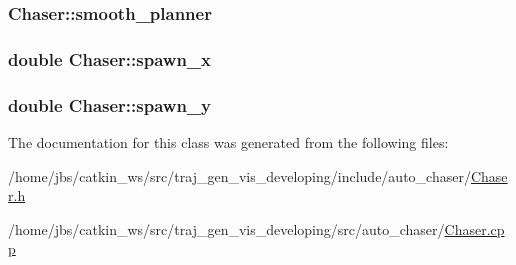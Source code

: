 \subsubsection[{\texorpdfstring{smooth\+\_\+planner}{smooth_planner}}]{ Chaser\+::smooth\+\_\+planner\hspace{0.3cm}{\ttfamily [private]}}\hypertarget{class_chaser_aab300ace64ce35c982c546cfce13f476}{}\label{class_chaser_aab300ace64ce35c982c546cfce13f476}
\subsubsection[{\texorpdfstring{spawn\+\_\+x}{spawn_x}}]{\setlength{\rightskip}{0pt plus 5cm}double Chaser\+::spawn\+\_\+x\hspace{0.3cm}{\ttfamily [private]}}\hypertarget{class_chaser_aa524a9495a94838a3d6b07942f1497dc}{}\label{class_chaser_aa524a9495a94838a3d6b07942f1497dc}
\subsubsection[{\texorpdfstring{spawn\+\_\+y}{spawn_y}}]{\setlength{\rightskip}{0pt plus 5cm}double Chaser\+::spawn\+\_\+y\hspace{0.3cm}{\ttfamily [private]}}\hypertarget{class_chaser_ab7047204e49269b88f7393c61b6c2393}{}\label{class_chaser_ab7047204e49269b88f7393c61b6c2393}


The documentation for this class was generated from the following files\+:\begin{DoxyCompactItemize}
\item 
/home/jbs/catkin\+\_\+ws/src/traj\+\_\+gen\+\_\+vis\+\_\+developing/include/auto\+\_\+chaser/\hyperlink{_chaser_8h}{Chaser.\+h}\item 
/home/jbs/catkin\+\_\+ws/src/traj\+\_\+gen\+\_\+vis\+\_\+developing/src/auto\+\_\+chaser/\hyperlink{_chaser_8cpp}{Chaser.\+cpp}\end{DoxyCompactItemize}
